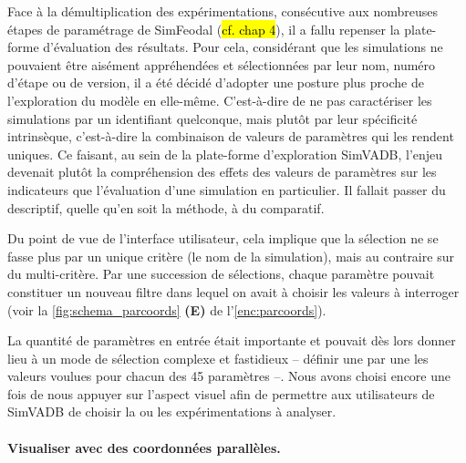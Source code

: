 Face à la démultiplication des expérimentations, consécutive aux nombreuses étapes de paramétrage de SimFeodal (\hl{cf. chap 4}), il a fallu repenser la plate-forme d'évaluation des résultats.
Pour cela, considérant que les simulations ne pouvaient être aisément appréhendées et sélectionnées par leur nom, numéro d'étape ou de version, il a été décidé d'adopter une posture plus proche de l'exploration du modèle en elle-même.
C'est-à-dire de ne pas caractériser les simulations par un identifiant quelconque, mais plutôt par leur spécificité intrinsèque, c'est-à-dire la combinaison de valeurs de paramètres qui les rendent uniques.
Ce faisant, au sein de la plate-forme d'exploration SimVADB, l'enjeu devenait plutôt la compréhension des effets des valeurs de paramètres sur les indicateurs que l'évaluation d'une simulation en particulier.
Il fallait passer du descriptif, quelle qu'en soit la méthode, à du comparatif.

Du point de vue de l'interface utilisateur, cela implique que la sélection ne se fasse plus par un unique critère (le nom de la simulation), mais au contraire sur du multi-critère.
Par une succession de sélections, chaque paramètre pouvait constituer un nouveau filtre dans lequel on avait à choisir les valeurs à interroger (voir la \cref{fig:schema_parcoords} \textbf{(E)} de l'\cref{enc:parcoords}).

La quantité de paramètres en entrée était importante et pouvait dès lors donner lieu à un mode de sélection complexe et fastidieux -- définir une par une les valeurs voulues pour chacun des 45 paramètres --.
Nous avons choisi encore une fois de nous appuyer sur l'aspect visuel afin de permettre aux utilisateurs de SimVADB de choisir la ou les expérimentations à analyser.


\paragraph{Visualiser avec des coordonnées parallèles.}

